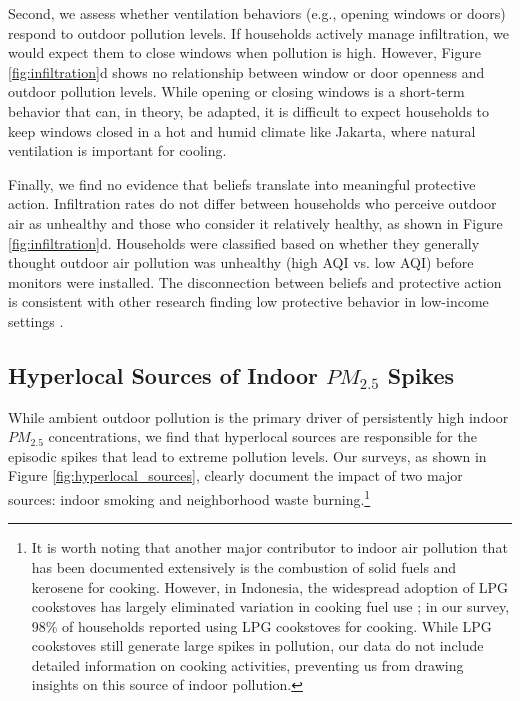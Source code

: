 \documentclass[9pt,twocolumn,twoside]{pnas-new}
\begin{document}
Second, we assess whether ventilation behaviors (e.g., opening windows or doors) respond to outdoor pollution levels. If households actively manage infiltration, we would expect them to close windows when pollution is high. However, Figure \ref{fig:infiltration}d shows no relationship between window or door openness and outdoor pollution levels. While opening or closing windows is a short-term behavior that can, in theory, be adapted, it is difficult to expect households to keep windows closed in a hot and humid climate like Jakarta, where natural ventilation is important for cooling. 

Finally, we find no evidence that beliefs translate into meaningful protective action. Infiltration rates do not differ between households who perceive outdoor air as unhealthy and those who consider it relatively healthy, as shown in Figure \ref{fig:infiltration}d. Households were classified based on whether they generally thought outdoor air pollution was unhealthy (high AQI vs. low AQI) before monitors were installed. The disconnection between beliefs and protective action is consistent with other research finding low protective behavior in low-income settings \citep{greenstone_indoor_2021, chowdhury_misbeliefs_2025}.



\subsection{Hyperlocal Sources of Indoor $PM_{2.5}$ Spikes}
While ambient outdoor pollution is the primary driver of persistently high indoor $PM_{2.5}$ concentrations, we find that hyperlocal sources are responsible for the episodic spikes that lead to extreme pollution levels. Our surveys, as shown in Figure \ref{fig:hyperlocal_sources}, clearly document the impact of two major sources: indoor smoking and neighborhood waste burning.\footnote{It is worth noting that another major contributor to indoor air pollution that has been documented extensively is the combustion of solid fuels and kerosene for cooking. However, in Indonesia, the widespread adoption of LPG cookstoves has largely eliminated variation in cooking fuel use \citep{astuti_successful_2019}; in our survey, 98\% of households reported using LPG cookstoves for cooking. While LPG cookstoves still generate large spikes in pollution, our data do not include detailed information on cooking activities, preventing us from drawing insights on this source of indoor pollution.}
\end{document}
